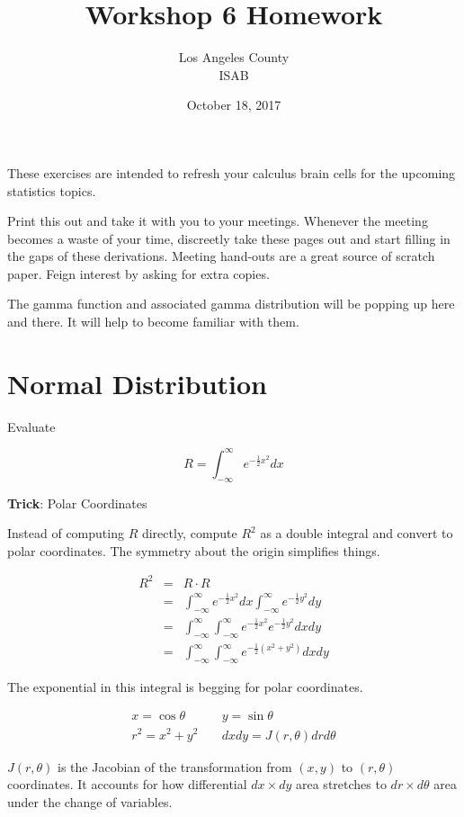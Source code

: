 \documentclass[]{article}
\title{Workshop 6 Homework}
\author{Los Angeles County\\ISAB}
\date{October 18, 2017}
\begin{document}
\maketitle
These exercises are intended to refresh your calculus brain
cells for the upcoming statistics topics.

Print this out and take it with you to your meetings.
Whenever the meeting becomes a waste of your time, discreetly take
these pages out and start filling in the gaps of these derivations.
Meeting hand-outs are a great source of scratch paper.
Feign interest by asking for extra copies.

The gamma function and associated gamma distribution
will be popping up here and there.  It will help to become
familiar with them.

\section*{Normal Distribution}


Evaluate

$$
R = \int_{-\infty}^{\infty} e^{-\frac{1}{2} x^2} dx
$$

\textbf{Trick}: Polar Coordinates

Instead of computing $R$ directly, compute $R^2$ as a
double integral and convert to polar coordinates.  The
symmetry about the origin simplifies things.

\begin{eqnarray*}
R^2 &= & R \cdot R \\
  &= & \int_{-\infty}^{\infty} e^{-\frac{1}{2} x^2} dx 
       \int_{-\infty}^{\infty} e^{-\frac{1}{2} y^2} dy \\
  &= & \int_{-\infty}^{\infty} \int_{-\infty}^{\infty}
       e^{-\frac{1}{2} x^2} e^{-\frac{1}{2} y^2} dx dy \\
  &= & \int_{-\infty}^{\infty} \int_{-\infty}^{\infty}
       e^{-\frac{1}{2} (x^2 + y^2)} dx dy
\end{eqnarray*}

The exponential in this integral is begging for polar
coordinates.

\begin{eqnarray*}
x = \cos\theta & \; & y = \sin\theta \\
r^2 = x^2 + y^2 & \; & dx dy = J(r,\theta) dr d\theta
\end{eqnarray*}

$J(r,\theta)$ is the Jacobian of the transformation from
$(x,y)$ to $(r,\theta)$ coordinates.  It accounts for how
differential $dx \times dy$ area stretches to $dr \times d\theta$
area under the change of variables.
\end{document}
